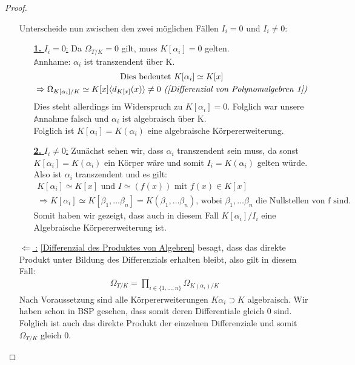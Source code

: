 \documentclass[10pt,a4paper]{report}
\newcommand{\comment}[1]{}
\newcommand{\divR}[2]{\Omega_{#1/#2}}
\newcommand{\divf}[1]{d_{#1}}
\begin{document}
\begin{proof}
\begin{itemize}
Unterscheide nun zwischen den zwei möglichen Fällen \underline{$I_i = 0$} und \underline{$I_i \neq 0$}:
\begin{itemize}
\item[\underline{\textbf{1.} $I_i = 0$:}] Da $\divR{T}{K} = 0$ gilt, muss  $K[\alpha_i] = 0$ gelten.\\
$\mathbb{A}$nnhame: $\alpha_i$ ist transzendent über K.
\begin{gather*}
\text{Dies bedeutet } K[\alpha_i] \simeq K[x] \\
\Rightarrow \divR{K[\alpha_i]}{K} \simeq K[x]\langle \divf{K[x]}(x) \rangle \neq 0 \textit{ (\cref{Differenzial von Polynomalgebren 1})}
\end{gather*}
Dies steht allerdings im Widerspruch zu $K[\alpha_i] = 0$. Folglich war unsere $\mathbb{A}$nnahme falsch und $\alpha_i$ ist algebraisch über K.\\
Folglich ist $K[\alpha_i] = K(\alpha_i)$ \comment{Nutze hier \label{*fuer a algebraisch gilt K[a] = K(a)}} eine algebraische Körpererweiterung.
\item[\underline{\textbf{2.} $I_i \neq 0$:}]
Zunächst sehen wir, dass $\alpha_i$ transzendent sein muss, da sonst $K[\alpha_i] = K(\alpha_i)$ ein Körper wäre und somit $I_i = K(\alpha_i)$ gelten würde.\\
Also ist $\alpha_i$ transzendent und es gilt:
\begin{gather*}
K[\alpha_i] \simeq K[x] \text{ und } I \simeq (f(x)) \text{ mit } f(x) \in K[x] \\
\Rightarrow K[\alpha_i] \simeq K[\beta_1, \dots \beta_n] = K(\beta_1, \dots \beta_n) \text{, wobei $\beta_1, \dots \beta_n$ die Nullstellen von f sind.}
\end{gather*}
Somit haben wir gezeigt, dass auch in diesem Fall $K[\alpha_i]/I_i$ eine Algebraische Körpererweiterung ist. 
\end{itemize}
\item[\underline{{\glqq $\Leftarrow$ \grqq :}}]
\cref{Differenzial des Produktes von Algebren} besagt, dass das direkte Produkt unter Bildung des Differenzials erhalten bleibt, also gilt in diesem Fall:
\begin{gather*}
\divR{T}{K} = \prod_{i \in \lbrace 1, \dots, n \rbrace} \divR{K(\alpha_i)}{K}
\end{gather*} 
Nach Voraussetzung sind alle Körpererweiterungen $K{\alpha_i} \supset K$ algebraisch. Wir haben schon in BSP gesehen, dass somit deren Differentiale gleich 0 sind. Folglich ist auch das direkte Produkt der einzelnen Differenziale und somit $\divR{T}{K}$ gleich 0.
\end{itemize}
\end{proof}
\end{document}
